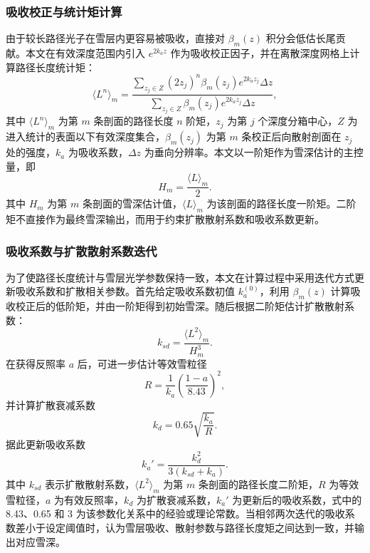 \subsubsection{吸收校正与统计矩计算}
由于较长路径光子在雪层内更容易被吸收，直接对 \(\beta_m(z)\) 积分会低估长尾贡献。本文在有效深度范围内引入 \(e^{2k_az}\) 作为吸收校正因子，并在离散深度网格上计算路径长度统计矩：
\begin{equation}
    \langle L^n\rangle_m =
    \frac{\sum_{z_j\in Z}(2z_j)^n\beta_m(z_j)e^{2k_az_j}\Delta z}
    {\sum_{z_j\in Z}\beta_m(z_j)e^{2k_az_j}\Delta z},
\end{equation}
其中 \(\langle L^n\rangle_m\) 为第 \(m\) 条剖面的路径长度 \(n\) 阶矩，\(z_j\) 为第 \(j\) 个深度分箱中心，\(Z\) 为进入统计的表面以下有效深度集合，\(\beta_m(z_j)\) 为第 \(m\) 条校正后向散射剖面在 \(z_j\) 处的强度，\(k_a\) 为吸收系数，\(\Delta z\) 为垂向分辨率。本文以一阶矩作为雪深估计的主控量，即
\begin{equation}
    H_m=\frac{\langle L\rangle_m}{2}.
\end{equation}
其中 \(H_m\) 为第 \(m\) 条剖面的雪深估计值，\(\langle L\rangle_m\) 为该剖面的路径长度一阶矩。二阶矩不直接作为最终雪深输出，而用于约束扩散散射系数和吸收系数更新。

\subsubsection{吸收系数与扩散散射系数迭代}
为了使路径长度统计与雪层光学参数保持一致，本文在计算过程中采用迭代方式更新吸收系数和扩散相关参数。首先给定吸收系数初值 \(k_a^{(0)}\)，利用 \(\beta_m(z)\) 计算吸收校正后的低阶矩，并由一阶矩得到初始雪深。随后根据二阶矩估计扩散散射系数：
\begin{equation}
    k_{sd}=\frac{\langle L^2\rangle_m}{H_m^3}.
\end{equation}
在获得反照率 \(a\) 后，可进一步估计等效雪粒径
\begin{equation}
    R=\frac{1}{k_a}\left(\frac{1-a}{8.43}\right)^2,
\end{equation}
并计算扩散衰减系数
\begin{equation}
    k_d=0.65\sqrt{\frac{k_a}{R}}.
\end{equation}
据此更新吸收系数
\begin{equation}
    k_a'=\frac{k_d^2}{3(k_{sd}+k_a)}.
\end{equation}
其中 \(k_{sd}\) 表示扩散散射系数，\(\langle L^2\rangle_m\) 为第 \(m\) 条剖面的路径长度二阶矩，\(R\) 为等效雪粒径，\(a\) 为有效反照率，\(k_d\) 为扩散衰减系数，\(k_a'\) 为更新后的吸收系数，式中的 8.43、0.65 和 3 为该参数化关系中的经验或理论常数。当相邻两次迭代的吸收系数差小于设定阈值时，认为雪层吸收、散射参数与路径长度矩之间达到一致，并输出对应雪深。

